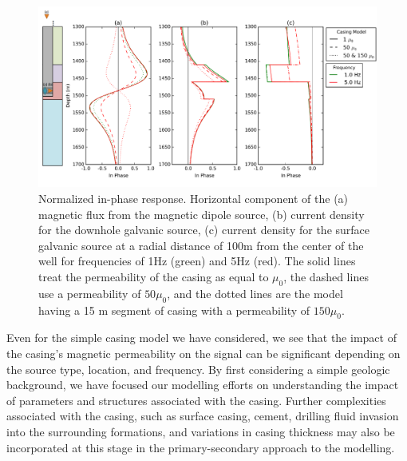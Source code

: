 \documentclass{segabs}
\begin{document}
\begin{figure}[h!]
	\centering
	\includegraphics[width=1\columnwidth]{./Figures/AnomMu}
	\caption{Normalized in-phase response. Horizontal component of the (a) magnetic flux from the magnetic dipole source, (b) current density for the downhole galvanic source, (c) current density for the surface galvanic source at a radial distance of 100m from the center of the well for frequencies of 1Hz (green) and 5Hz (red). The solid lines treat the permeability of the casing as equal to $\mu_0$, the dashed lines use a permeability of $50 \mu_0$, and the dotted lines are the model having a 15 m segment of casing with a permeability of $150 \mu_0$.}
	\label{fig:AnomMu}
\end{figure}
Even for the simple casing model we have considered, we see that the impact of the casing's magnetic permeability on the signal can be significant depending on the source type, location, and frequency. By first considering a simple geologic background, we have focused our modelling efforts on understanding the impact of parameters and structures associated with the casing. Further complexities associated with the casing, such as surface casing, cement, drilling fluid invasion into the surrounding formations, and variations in casing thickness may also be incorporated at this stage in the primary-secondary approach to the modelling.
\end{document}
